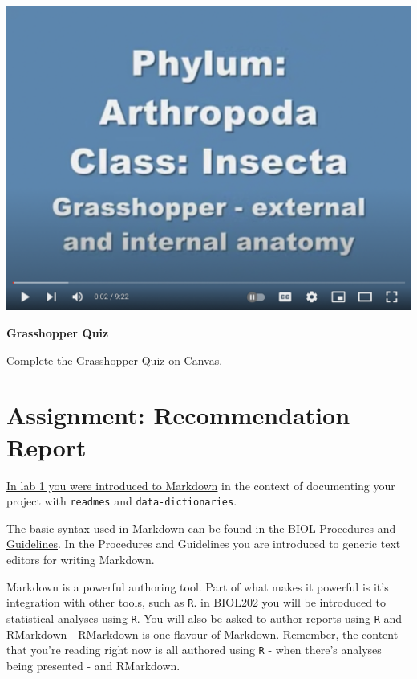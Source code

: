 \documentclass[
]{book}
\begin{document}
\includegraphics{images/Lab4_Grasshopper_Dissection_Video1.png}

\textbf{Grasshopper Quiz}

Complete the Grasshopper Quiz on
\href{https://canvas.ubc.ca/}{Canvas}.

\hypertarget{assignment-recommendation-report}{%
\chapter*{Assignment: Recommendation Report}\label{assignment-recommendation-report}}

\href{https://ubco-biology.github.io/Procedures-and-Guidelines/readme-files-and-data-dictionaries.html\#markdown}{In lab 1 you were introduced to Markdown} in the context of documenting your project with \texttt{readmes} and \texttt{data-dictionaries}.

The basic syntax used in Markdown can be found in the \href{https://ubco-biology.github.io/Procedures-and-Guidelines/markdown-1.html}{BIOL Procedures and Guidelines}. In the Procedures and Guidelines you are introduced to generic text editors for writing Markdown.

Markdown is a powerful authoring tool. Part of what makes it powerful is it's integration with other tools, such as \texttt{R}. in BIOL202 you will be introduced to statistical analyses using \texttt{R}. You will also be asked to author reports using \texttt{R} and RMarkdown - \href{https://ubco-biology.github.io/Procedures-and-Guidelines/markdown-flavours.html}{RMarkdown is one flavour of Markdown}. Remember, the content that you're reading right now is all authored using \texttt{R} - when there's analyses being presented - and RMarkdown.
\end{document}

